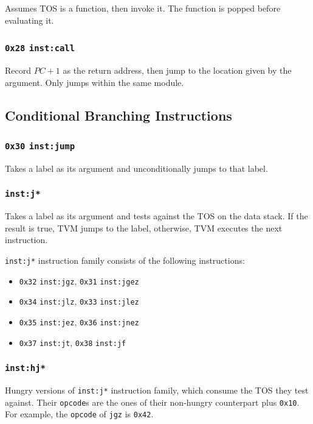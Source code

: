 \documentclass{article}
\newcommand{\inst}[1] {\texttt{inst:#1}}
\begin{document}
Assumes TOS is a function, then invoke it. The function is popped before evaluating it.

\subsubsection{\texttt{0x28} \inst{call}}

Record $PC + 1$ as the return address, then jump to the location given by the argument. Only jumps within the same module.

\subsection{Conditional Branching Instructions}

\subsubsection{\texttt{0x30} \inst{jump}}

Takes a label as its argument and unconditionally jumps to that label.

\subsubsection{\inst{j*}}

Takes a label as its argument and tests against the TOS on the data stack. If the result is true, TVM jumps to the label, otherwise, TVM executes the next instruction.

\inst{j*} instruction family consists of the following instructions:
\begin{itemize}
\item \texttt{0x32} \inst{jgz}, \texttt{0x31} \inst{jgez}
\item \texttt{0x34} \inst{jlz}, \texttt{0x33} \inst{jlez}
\item \texttt{0x35} \inst{jez}, \texttt{0x36} \inst{jnez}
\item \texttt{0x37} \inst{jt}, \texttt{0x38} \inst{jf}
\end{itemize}

\subsubsection{\inst{hj*}}

Hungry versions of \inst{j*} instruction family, which consume the TOS they test against. Their \texttt{opcode}s are the ones of their non-hungry counterpart plus \texttt{0x10}. For example, the \texttt{opcode} of \texttt{jgz} is \texttt{0x42}.
\end{document}
